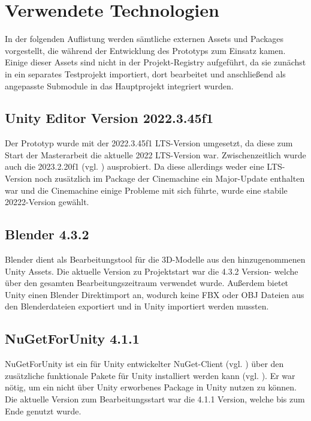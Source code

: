 \section{Verwendete Technologien}

In der folgenden Auflistung werden sämtliche externen Assets und Packages vorgestellt, die während der Entwicklung des Prototyps zum Einsatz kamen. Einige dieser Assets sind nicht in der Projekt-Registry aufgeführt, da sie zunächst in ein separates Testprojekt importiert, dort bearbeitet und anschließend als angepasste Submodule in das Hauptprojekt integriert wurden.

\subsection{Unity Editor Version 2022.3.45f1}
Der Prototyp wurde mit der 2022.3.45f1 \ac{LTS}-Version umgesetzt, da diese zum Start der Masterarbeit die aktuelle 2022 \ac{LTS}-Version war. Zwischenzeitlich wurde auch die 2023.2.20f1 (vgl. \citealp{unity_technologies_unity_2024}) ausprobiert. Da diese allerdings weder eine \ac{LTS}-Version noch zusätzlich im Package der Cinemachine ein Major-Update enthalten war und die Cinemachine einige Probleme mit sich führte, wurde eine stabile 20222-Version gewählt.

\subsection{Blender 4.3.2}
Blender dient als Bearbeitungstool für die 3D-Modelle aus den hinzugenommenen Unity Assets. Die aktuelle Version zu Projektstart war die 4.3.2 Version- welche über den gesamten Bearbeitungszeitraum verwendet wurde. Außerdem bietet Unity einen Blender Direktimport an, wodurch keine \ac{FBX} oder \ac{OBJ} Dateien aus den Blenderdateien exportiert und in Unity importiert werden mussten.

\subsection{NuGetForUnity 4.1.1}
NuGetForUnity ist ein für Unity entwickelter NuGet-Client (vgl. \citealp{microsoft_nuget_2010}) über den zusätzliche funktionale Pakete für Unity installiert werden kann (vgl. \citealp{mccarthy_glitchenzonugetforunity_2024}). Er war nötig, um ein nicht über Unity erworbenes Package in Unity nutzen zu können. Die aktuelle Version zum Bearbeitungsstart war die 4.1.1 Version, welche bis zum Ende genutzt wurde.

